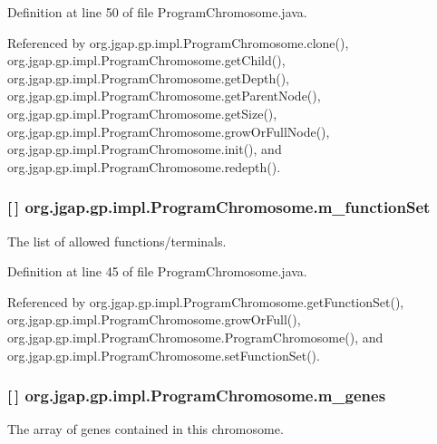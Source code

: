 Definition at line 50 of file Program\-Chromosome.\-java.



Referenced by org.\-jgap.\-gp.\-impl.\-Program\-Chromosome.\-clone(), org.\-jgap.\-gp.\-impl.\-Program\-Chromosome.\-get\-Child(), org.\-jgap.\-gp.\-impl.\-Program\-Chromosome.\-get\-Depth(), org.\-jgap.\-gp.\-impl.\-Program\-Chromosome.\-get\-Parent\-Node(), org.\-jgap.\-gp.\-impl.\-Program\-Chromosome.\-get\-Size(), org.\-jgap.\-gp.\-impl.\-Program\-Chromosome.\-grow\-Or\-Full\-Node(), org.\-jgap.\-gp.\-impl.\-Program\-Chromosome.\-init(), and org.\-jgap.\-gp.\-impl.\-Program\-Chromosome.\-redepth().

\hypertarget{classorg_1_1jgap_1_1gp_1_1impl_1_1_program_chromosome_a9d7f024ebd3113416251c968d06dce6d}{
\subsubsection[{m\-\_\-function\-Set}]{ \mbox{[}$\,$\mbox{]} org.\-jgap.\-gp.\-impl.\-Program\-Chromosome.\-m\-\_\-function\-Set\hspace{0.3cm}{\ttfamily [private]}}}\label{classorg_1_1jgap_1_1gp_1_1impl_1_1_program_chromosome_a9d7f024ebd3113416251c968d06dce6d}
The list of allowed functions/terminals. 

Definition at line 45 of file Program\-Chromosome.\-java.



Referenced by org.\-jgap.\-gp.\-impl.\-Program\-Chromosome.\-get\-Function\-Set(), org.\-jgap.\-gp.\-impl.\-Program\-Chromosome.\-grow\-Or\-Full(), org.\-jgap.\-gp.\-impl.\-Program\-Chromosome.\-Program\-Chromosome(), and org.\-jgap.\-gp.\-impl.\-Program\-Chromosome.\-set\-Function\-Set().

\hypertarget{classorg_1_1jgap_1_1gp_1_1impl_1_1_program_chromosome_ad3903410ad37a12a87ee51b4a3f4858a}{
\subsubsection[{m\-\_\-genes}]{ \mbox{[}$\,$\mbox{]} org.\-jgap.\-gp.\-impl.\-Program\-Chromosome.\-m\-\_\-genes\hspace{0.3cm}{\ttfamily [private]}}}\label{classorg_1_1jgap_1_1gp_1_1impl_1_1_program_chromosome_ad3903410ad37a12a87ee51b4a3f4858a}
The array of genes contained in this chromosome. 

